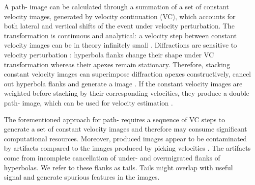 
A path- image can be calculated through a summation of a set of constant velocity images, 
generated by velocity continuation (VC), which accounts for both lateral and vertical shifts of the event
under velocity perturbation. The  transformation is continuous and analytical:
a velocity step between constant velocity images can be in theory 
infinitely small \cite[]{claerbout86,fomel94,Fomel_03_VC_,Fomel_03_VC,Burnett_aniso,decker}. Diffractions are sensitive to velocity
perturbation \cite[]{novais_etal1}: hyperbola flanks change their shape under VC transformation whereas their apexes remain stationary. 
Therefore, stacking constant velocity images can superimpose diffraction apexes constructively,
cancel out hyperbola flanks 
and generate a image \cite[]{Burnett11}. If the constant velocity images are weighted before stacking
by their corresponding velocities, they produce
a double path- image, which can be used for velocity estimation \cite[]{schleicher_costa09,santos2016robust}.

The forementioned approach for path-   requires a sequence of VC steps to generate a set
of constant velocity images and therefore may consume significant computational resources. Moreover, produced images appear
to be contaminated by artifacts 
compared to the images produced by picking velocities \cite[]{Burnett11}. The artifacts come from incomplete 
cancellation of under- and overmigrated flanks of hyperbolas. We refer to these flanks as tails. Tails might 
overlap with useful signal and generate spurious features in the images.   
 
